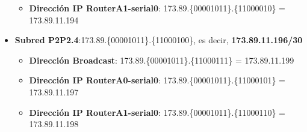 \begin{itemize}
\begin{itemize}
			\item{\textbf{Dirección IP RouterA1-serial0}}: 173.89.\{\textcolor{azul}{000010}\textcolor{rojo}{11}\}.\{\textcolor{rojo}{110000}10\} = 173.89.11.194
		\end{itemize}
	\item{\textbf{Subred P2P2.4}:}173.89.\{\textcolor{azul}{000010}\textcolor{rojo}{11}\}.\{\textcolor{rojo}{110001}00\}, es decir, \textbf{173.89.11.196/30}
		\begin{itemize}
			\item{\textbf{Dirección Broadcast}}: 173.89.\{\textcolor{azul}{000010}\textcolor{rojo}{11}\}.\{\textcolor{rojo}{110001}11\} = 173.89.11.199
			\item{\textbf{Dirección IP RouterA0-serial0}}: 173.89.\{\textcolor{azul}{000010}\textcolor{rojo}{11}\}.\{\textcolor{rojo}{110001}01\} = 173.89.11.197
			\item{\textbf{Dirección IP RouterA1-serial0}}: 173.89.\{\textcolor{azul}{000010}\textcolor{rojo}{11}\}.\{\textcolor{rojo}{110001}10\} = 173.89.11.198
		\end{itemize}
\end{itemize}






